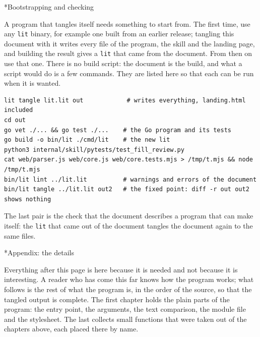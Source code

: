 \documentclass[10pt,a4paper]{article}
\makeatletter
\renewcommand\section{\@startsection{section}{1}{\z@}{-3.2ex \@plus -1ex \@minus -.2ex}{1.2ex \@plus .2ex}{\normalfont\LARGE\itshape}}
\makeatother
\begin{document}
\section*{Bootstrapping and checking}

A program that tangles itself needs something to start from. The first time, use any \texttt{lit} binary, for example one built from an earlier release; tangling this document with it writes every file of the program, the skill and the landing page, and building the result gives a \texttt{lit} that came from the document. From then on use that one. There is no build script: the document is the build, and what a script would do is a few commands. They are listed here so that each can be run when it is wanted.

\begin{Verbatim}
lit tangle lit.lit out            # writes everything, landing.html included
cd out
go vet ./... && go test ./...    # the Go program and its tests
go build -o bin/lit ./cmd/lit    # the new lit
python3 internal/skill/pytests/test_fill_review.py
cat web/parser.js web/core.js web/core.tests.mjs > /tmp/t.mjs && node /tmp/t.mjs
bin/lit lint ../lit.lit          # warnings and errors of the document
bin/lit tangle ../lit.lit out2   # the fixed point: diff -r out out2 shows nothing
\end{Verbatim}

The last pair is the check that the document describes a program that can make itself: the \texttt{lit} that came out of the document tangles the document again to the same files.

\hypertarget{h-Appendix-the-details}{}
\section*{Appendix: the details}

Everything after this page is here because it is needed and not because it is interesting. A reader who has come this far knows how the program works; what follows is the rest of what the program is, in the order of the source, so that the tangled output is complete. The first chapter holds the plain parts of the program: the entry point, the arguments, the text comparison, the module file and the stylesheet. The last collects small functions that were taken out of the chapters above, each placed there by name.

\hypertarget{h-Appendix-the-plain-parts}{}
\end{document}
